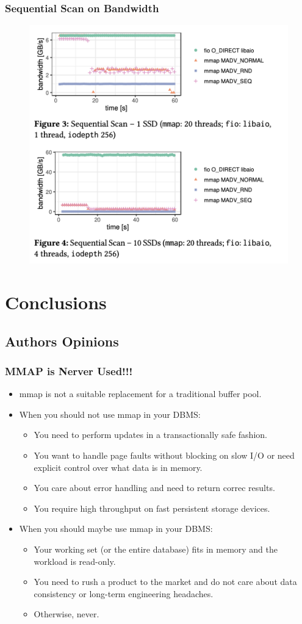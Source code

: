 \documentclass[10pt,svgnames,fragile]{beamer}
\begin{document}
\begin{frame}
	\frametitle{Sequential Scan on Bandwidth}
	\begin{figure}[h]
		\includegraphics[width=0.65\linewidth]{images/ss.png}
	\end{figure}
\end{frame}

\section{Conclusions}
\subsection{Authors Opinions}
\begin{frame}
	\frametitle{MMAP is Nerver Used!!!}
	\begin{itemize}
		\item mmap is not a suitable replacement for a traditional buffer pool.
		\item When you should not use mmap in your DBMS:
		\begin{itemize}
			\item<1->[$\ast$] You need to perform updates in a transactionally safe fashion.
			\item<2->[$\ast$] You want to handle page faults without blocking on slow I/O
			or need explicit control over what data is in memory.
			\item<3->[$\ast$] You care about error handling and need to return correc  results.
			\item<4->[$\ast$] You require high throughput on fast persistent storage devices.
		\end{itemize}
		\item<5-> When you should maybe use mmap in your DBMS:
		\begin{itemize}
			\item<6->[\checkmark] Your working set (or the entire database) fits in memory and
			the workload is read-only.
			\item<7->[\checkmark] You need to rush a product to the market and do not care about
			data consistency or long-term engineering headaches.
			\item<8->[\checkmark] Otherwise, never.
		\end{itemize}
		
	\end{itemize}
\end{frame}
\end{document}

